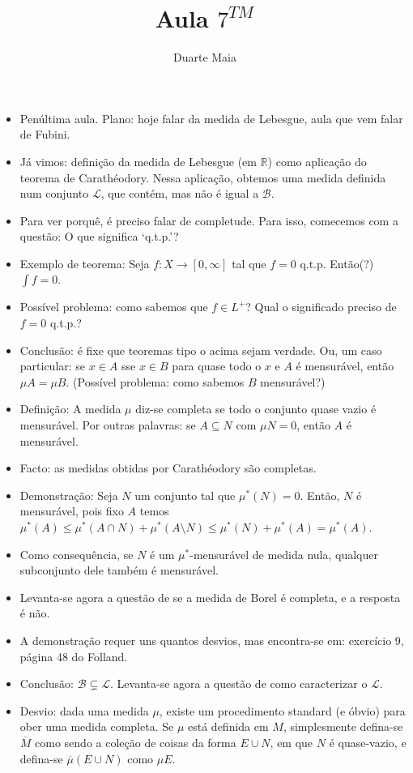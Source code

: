 \documentclass{article}
\title{Aula $7^{TM}$}
\author{Duarte Maia}
\date{}
\newcommand{\R}{\mathbb{R}}
\renewcommand{\cal}[1]{\mathcal{#1}}
\begin{document}
\maketitle

\begin{itemize}
\item Penúltima aula. Plano: hoje falar da medida de Lebesgue, aula que vem falar de Fubini.
\item Já vimos: definição da medida de Lebesgue (em $\R$) como aplicação do teorema de Carathéodory. Nessa aplicação, obtemos uma medida definida num conjunto $\cal L$, que contém, mas não é igual a $\cal B$.
\item Para ver porquê, é preciso falar de completude. Para isso, comecemos com a questão: O que significa `q.t.p.'?
\item Exemplo de teorema: Seja $f : X \to [0,\infty]$ tal que $f = 0$ q.t.p. Então(?) $\int f = 0$.
\item Possível problema: como sabemos que $f \in L^+$? Qual o significado preciso de $f = 0$ q.t.p.?
\item Conclusão: é fixe que teoremas tipo o acima sejam verdade. Ou, um caso particular: se $x \in A$ sse $x \in B$ para quase todo o $x$ e $A$ é mensurável, então $\mu A = \mu B$. (Possível problema: como sabemos $B$ mensurável?)
\item Definição: A medida $\mu$ diz-se completa se todo o conjunto quase vazio é mensurável. Por outras palavras: se $A \subseteq N$ com $\mu N = 0$, então $A$ é mensurável.
\item Facto: as medidas obtidas por Carathéodory são completas.
\item Demonstração: Seja $N$ um conjunto tal que $\mu^*(N) = 0$. Então, $N$ é mensurável, pois fixo $A$ temos $\mu^*(A) \leq \mu^*(A\cap N) + \mu^*(A \setminus N) \leq \mu^*(N) + \mu^*(A) = \mu^*(A)$.
\item Como consequência, se $N$ é um $\mu^*$-mensurável de medida nula, qualquer subconjunto dele também é mensurável.
\item Levanta-se agora a questão de se a medida de Borel é completa, e a resposta é não.
\item A demonstração requer uns quantos desvios, mas encontra-se em: exercício 9, página 48 do Folland.
\item Conclusão: $\cal B \subsetneq \cal L$. Levanta-se agora a questão de como caracterizar o $\cal L$.
\item Desvio: dada uma medida $\mu$, existe um procedimento standard (e óbvio) para ober uma medida completa. Se $\mu$ está definida em $M$, simplesmente defina-se $\overline M$ como sendo a coleção de coisas da forma $E \cup N$, em que $N$ é quase-vazio, e defina-se $\overline \mu(E \cup N)$ como $\mu E$.

\end{itemize}
\end{document}

